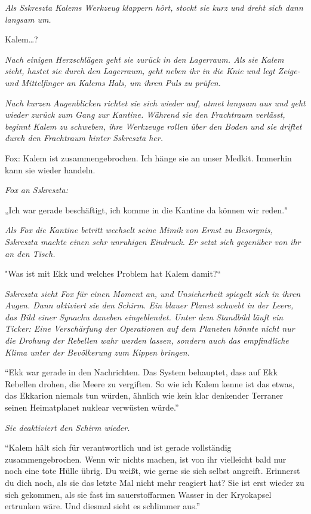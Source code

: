 \documentclass[11pt]{scrartcl}
\begin{document}
\emph{Als Sskreszta Kalems Werkzeug klappern hört, stockt sie kurz und
dreht sich dann langsam um.}

Kalem\ldots{}?

\emph{Nach einigen Herzschlägen geht sie zurück in den Lagerraum. Als
sie Kalem sieht, hastet sie durch den Lagerraum, geht neben ihr in die
Knie und legt Zeige- und Mittelfinger an Kalems Hals, um ihren Puls zu
prüfen.}

\emph{Nach kurzen Augenblicken richtet sie sich wieder auf, atmet
langsam aus und geht wieder zurück zum Gang zur Kantine. Während sie den
Frachtraum verlässt, beginnt Kalem zu schweben, ihre Werkzeuge rollen
über den Boden und sie driftet durch den Frachtraum hinter Sskreszta
her.}

Fox: Kalem ist zusammengebrochen. Ich hänge sie an unser Medkit.
Immerhin kann sie wieder handeln.

\emph{Fox an Sskreszta:}

„Ich war gerade beschäftigt, ich komme in die Kantine da können wir
reden."

\emph{Als Fox die Kantine betritt wechselt seine Mimik von Ernst zu
Besorgnis, Sskreszta machte einen sehr unruhigen Eindruck. Er setzt sich
gegenüber von ihr an den Tisch.}

"Was ist mit Ekk und welches Problem hat Kalem damit?``

\emph{Sskreszta sieht Fox für einen Moment an, und Unsicherheit spiegelt
sich in ihren Augen. Dann aktiviert sie den Schirm. Ein blauer Planet
schwebt in der Leere, das Bild einer Synachu daneben eingeblendet. Unter
dem Standbild läuft ein Ticker: Eine Verschärfung der Operationen auf
dem Planeten könnte nicht nur die Drohung der Rebellen wahr werden
lassen, sondern auch das empfindliche Klima unter der Bevölkerung zum
Kippen bringen.}

``Ekk war gerade in den Nachrichten. Das System behauptet, dass auf Ekk
Rebellen drohen, die Meere zu vergiften. So wie ich Kalem kenne ist das
etwas, das Ekkarion niemals tun würden, ähnlich wie kein klar denkender
Terraner seinen Heimatplanet nuklear verwüsten würde.''

\emph{Sie deaktiviert den Schirm wieder.}

``Kalem hält sich für verantwortlich und ist gerade vollständig
zusammengebrochen. Wenn wir nichts machen, ist von ihr vielleicht bald
nur noch eine tote Hülle übrig. Du weißt, wie gerne sie sich selbst
angreift. Erinnerst du dich noch, als sie das letzte Mal nicht mehr
reagiert hat? Sie ist erst wieder zu sich gekommen, als sie fast im
sauerstoffarmen Wasser in der Kryokapsel ertrunken wäre. Und diesmal
sieht es schlimmer aus.''
\end{document}

